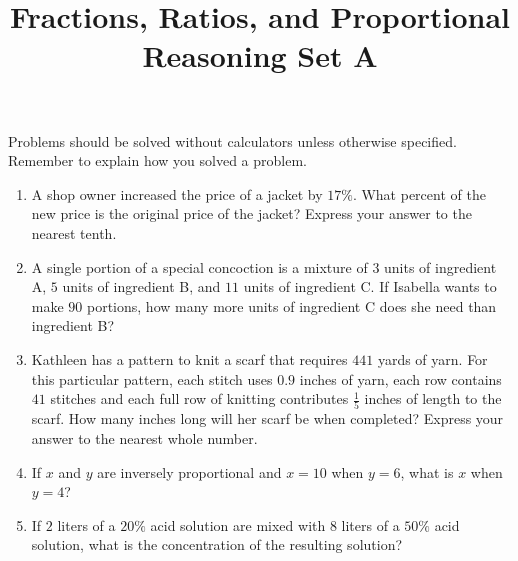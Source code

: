\documentclass{article}
\title{Fractions, Ratios, and Proportional Reasoning Set A}
\author{}
\date{}
\begin{document}
    \maketitle
    \noindent Problems should be solved without calculators unless otherwise
    specified. Remember to explain how you solved a problem.
    \begin{enumerate}
        \item A shop owner increased the price of a jacket by $17\%$. What
        percent of the new price is the original price of the jacket? Express
        your answer to the nearest tenth.
        \vspace{3cm}
        \item A single portion of a special concoction is a mixture of $3$ units
        of ingredient A, $5$ units of ingredient B, and $11$ units of ingredient
        C. If Isabella wants to make $90$ portions, how many more units of
        ingredient C does she need than ingredient B?
        \vspace{3cm}
        \item Kathleen has a pattern to knit a scarf that requires $441$ yards
        of yarn. For this particular pattern, each stitch uses $0.9$ inches of
        yarn, each row contains $41$ stitches and each full row of knitting
        contributes $\frac{1}{5}$ inches of length to the scarf. How many inches
        long will her scarf be when completed? Express your answer to the
        nearest whole number.
        \vspace{3cm}
        \item If $x$ and $y$ are inversely proportional and $x = 10$ when $y =
        6$, what is $x$ when $y = 4$?
        \vspace{3cm}
        \item If $2$ liters of a $20\%$ acid solution are mixed with $8$ liters
        of a $50\%$ acid solution, what is the concentration of the resulting
        solution?
        \vspace{3cm}
    \end{enumerate}
\end{document}

